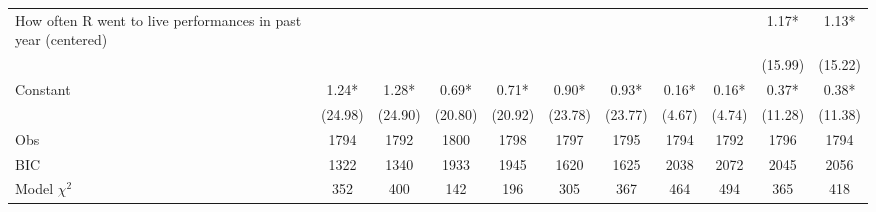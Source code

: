 {\begin{tabular*}{\hsize}{@{\hskip\tabcolsep\extracolsep\fill}l*{10}{c}}
How often R went to live performances in past year (centered)&             &             &             &             &             &             &             &             &        1.17*&        1.13*\\
                    &             &             &             &             &             &             &             &             &     (15.99) &     (15.22) \\
Constant            &        1.24*&        1.28*&        0.69*&        0.71*&        0.90*&        0.93*&        0.16*&        0.16*&        0.37*&        0.38*\\
                    &     (24.98) &     (24.90) &     (20.80) &     (20.92) &     (23.78) &     (23.77) &      (4.67) &      (4.74) &     (11.28) &     (11.38) \\
\midrule
Obs                 &        1794 &        1792 &        1800 &        1798 &        1797 &        1795 &        1794 &        1792 &        1796 &        1794 \\
BIC                 &        1322 &        1340 &        1933 &        1945 &        1620 &        1625 &        2038 &        2072 &        2045 &        2056 \\
Model $\chi^{2}$    &         352 &         400 &         142 &         196 &         305 &         367 &         464 &         494 &         365 &         418 \\
\bottomrule
\end{tabular*}
}
